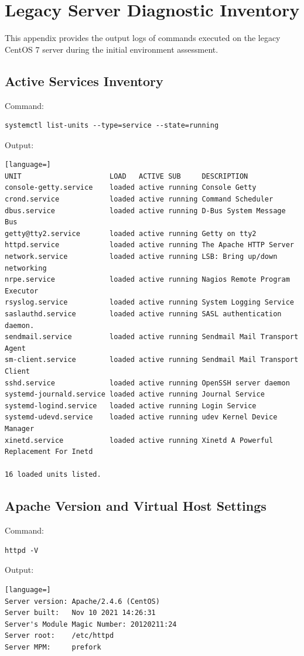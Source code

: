 \documentclass[11pt,a4paper,DIV=16,headings=normal,parskip=half]{scrartcl}
\begin{document}
\clearpage
\appendix

\section{Legacy Server Diagnostic Inventory}
\label{sec:legacy_inventory}
This appendix provides the output logs of commands executed on the legacy CentOS 7 server during the initial environment assessment.

\subsection{Active Services Inventory}
Command:
\begin{lstlisting}
systemctl list-units --type=service --state=running
\end{lstlisting}
Output:
\begin{lstlisting}[language=]
UNIT                     LOAD   ACTIVE SUB     DESCRIPTION
console-getty.service    loaded active running Console Getty
crond.service            loaded active running Command Scheduler
dbus.service             loaded active running D-Bus System Message Bus
getty@tty2.service       loaded active running Getty on tty2
httpd.service            loaded active running The Apache HTTP Server
network.service          loaded active running LSB: Bring up/down networking
nrpe.service             loaded active running Nagios Remote Program Executor
rsyslog.service          loaded active running System Logging Service
saslauthd.service        loaded active running SASL authentication daemon.
sendmail.service         loaded active running Sendmail Mail Transport Agent
sm-client.service        loaded active running Sendmail Mail Transport Client
sshd.service             loaded active running OpenSSH server daemon
systemd-journald.service loaded active running Journal Service
systemd-logind.service   loaded active running Login Service
systemd-udevd.service    loaded active running udev Kernel Device Manager
xinetd.service           loaded active running Xinetd A Powerful Replacement For Inetd

16 loaded units listed.
\end{lstlisting}

\subsection{Apache Version and Virtual Host Settings}
Command:
\begin{lstlisting}
httpd -V
\end{lstlisting}
Output:
\begin{lstlisting}[language=]
Server version: Apache/2.4.6 (CentOS)
Server built:   Nov 10 2021 14:26:31
Server's Module Magic Number: 20120211:24
Server root:    /etc/httpd
Server MPM:     prefork
\end{lstlisting}
\end{document}
